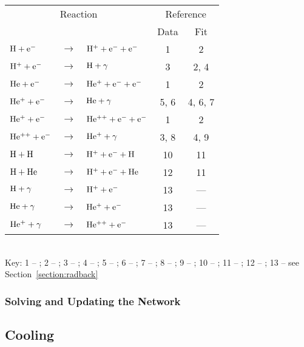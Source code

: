 \begin{table}
\begin{tabular}{lclcc}
\hline
\multicolumn{3}{c}{Reaction} & \multicolumn{2}{c}{Reference} \\
& & & Data & Fit \\
\hline
${\rm H + e^{-}}$ & $\rightarrow$ & $\rm{H^{+} + e^{-} + e^{-}}$ & 1 & 2 \\
${\rm H^{+} + e^{-}}$ & $\rightarrow$ & $\rm{H + \gamma} $ & 3 & 2, 4\\
${\rm He + e^{-}}$ & $\rightarrow$ & ${\rm He^{+} + e^{-} + e^{-}}$ & 1 & 2 \\
${\rm He^{+} + e^{-}}$ & $\rightarrow$ & ${\rm He + \gamma}$ & 5, 6 & 4, 6, 7 \\
${\rm He^{+} + e^{-}}$ & $\rightarrow$ & ${\rm He^{++} + e^{-} + e^{-}}$ & 1 & 2 \\
${\rm He^{++} + e^{-}}$ & $\rightarrow$ & ${\rm He^{+} + \gamma}$ & 3, 8 & 4, 9 \\
${\rm H + H}$ & $\rightarrow$ & ${\rm H^{+} + e^{-} + H}$ & 10 & 11 \\
${\rm H + He}$ & $\rightarrow$ & ${\rm H^{+} + e^{-} + He}$ & 12 & 11 \\
${\rm H + \gamma}$ & $\rightarrow$ & ${\rm H^{+} + e^{-}}$ & 13 & --- \\
${\rm He + \gamma}$ & $\rightarrow$ & ${\rm He^{+} + e^{-}}$ & 13 & --- \\
${\rm He^{+} + \gamma}$ & $\rightarrow$ & ${\rm He^{++} + e^{-}}$ & 13 & --- \\
\hline
\end{tabular}
\\ Key: 1 -- \citet{1987ephh.book.....J}; 2 -- \citet{1997NewA....2..181A}; 3 -- \citet{1992ApJ...387...95F}; 4 -- \citet{1997MNRAS.292...27H}; 5 -- \citet{1960MNRAS.121..471B}; 6 -- \citet{1973A&A....25..137A}; 7 -- \citet{1981MNRAS.197..553B}; 8 -- \citet{1978ppim.book.....S}; 9 -- \citet{1992ApJS...78..341C}; 10 -- \citet{1987PhRvA..36.3100G}; 11 -- \citet{1991ApJS...76..759L}; 12 -- \citet{1981JChPh..74..314V}; 13 -- see Section~\ref{section:radback}
\end{table}


\subsubsection{Solving and Updating the Network}



\subsection{Cooling} \label{Cooling}



